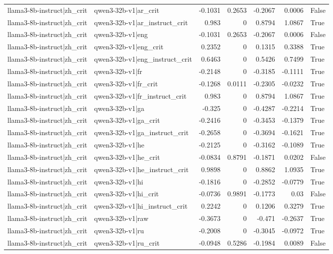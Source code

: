 \begin{table}
\begin{tabular}{l l r r r r l}
llama3-8b-instruct|zh_crit & qwen3-32b-v1|ar_crit & -0.1031 & 0.2653 & -0.2067 & 0.0006 & False \\
llama3-8b-instruct|zh_crit & qwen3-32b-v1|ar_instruct_crit & 0.983 & 0 & 0.8794 & 1.0867 & True \\
llama3-8b-instruct|zh_crit & qwen3-32b-v1|eng & -0.1031 & 0.2653 & -0.2067 & 0.0006 & False \\
llama3-8b-instruct|zh_crit & qwen3-32b-v1|eng_crit & 0.2352 & 0 & 0.1315 & 0.3388 & True \\
llama3-8b-instruct|zh_crit & qwen3-32b-v1|eng_instruct_crit & 0.6463 & 0 & 0.5426 & 0.7499 & True \\
llama3-8b-instruct|zh_crit & qwen3-32b-v1|fr & -0.2148 & 0 & -0.3185 & -0.1111 & True \\
llama3-8b-instruct|zh_crit & qwen3-32b-v1|fr_crit & -0.1268 & 0.0111 & -0.2305 & -0.0232 & True \\
llama3-8b-instruct|zh_crit & qwen3-32b-v1|fr_instruct_crit & 0.983 & 0 & 0.8794 & 1.0867 & True \\
llama3-8b-instruct|zh_crit & qwen3-32b-v1|ga & -0.325 & 0 & -0.4287 & -0.2214 & True \\
llama3-8b-instruct|zh_crit & qwen3-32b-v1|ga_crit & -0.2416 & 0 & -0.3453 & -0.1379 & True \\
llama3-8b-instruct|zh_crit & qwen3-32b-v1|ga_instruct_crit & -0.2658 & 0 & -0.3694 & -0.1621 & True \\
llama3-8b-instruct|zh_crit & qwen3-32b-v1|he & -0.2125 & 0 & -0.3162 & -0.1089 & True \\
llama3-8b-instruct|zh_crit & qwen3-32b-v1|he_crit & -0.0834 & 0.8791 & -0.1871 & 0.0202 & False \\
llama3-8b-instruct|zh_crit & qwen3-32b-v1|he_instruct_crit & 0.9898 & 0 & 0.8862 & 1.0935 & True \\
llama3-8b-instruct|zh_crit & qwen3-32b-v1|hi & -0.1816 & 0 & -0.2852 & -0.0779 & True \\
llama3-8b-instruct|zh_crit & qwen3-32b-v1|hi_crit & -0.0736 & 0.9891 & -0.1773 & 0.03 & False \\
llama3-8b-instruct|zh_crit & qwen3-32b-v1|hi_instruct_crit & 0.2242 & 0 & 0.1206 & 0.3279 & True \\
llama3-8b-instruct|zh_crit & qwen3-32b-v1|raw & -0.3673 & 0 & -0.471 & -0.2637 & True \\
llama3-8b-instruct|zh_crit & qwen3-32b-v1|ru & -0.2008 & 0 & -0.3045 & -0.0972 & True \\
llama3-8b-instruct|zh_crit & qwen3-32b-v1|ru_crit & -0.0948 & 0.5286 & -0.1984 & 0.0089 & False \\

\end{tabular}
\end{table}
